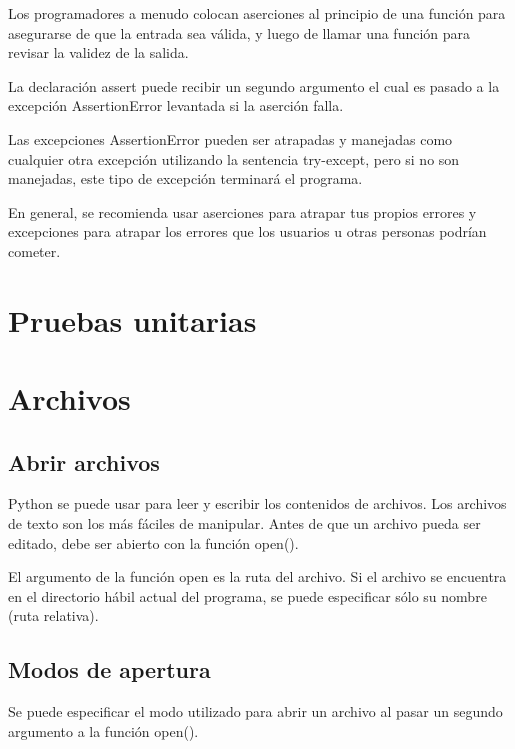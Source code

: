 \documentclass{report}
\begin{document}

Los programadores a menudo colocan aserciones al principio de una función para asegurarse de que la entrada sea válida, y luego de llamar una función para revisar la validez de la salida.

La declaración assert puede recibir un segundo argumento el cual es pasado a la excepción AssertionError levantada si la aserción falla.


Las excepciones AssertionError pueden ser atrapadas y manejadas como cualquier otra excepción utilizando la sentencia try-except, pero si no son manejadas, este tipo de excepción terminará el programa.

En general, se recomienda usar aserciones para atrapar tus propios errores y excepciones para atrapar los errores que los usuarios u otras personas podrían cometer.


\clearpage\chapter{Pruebas unitarias}

\clearpage\chapter{Archivos}

\section{Abrir archivos}

Python se puede usar para leer y escribir los contenidos de archivos. Los archivos de texto son los más fáciles de manipular.
Antes de que un archivo pueda ser editado, debe ser abierto con la función open().


El argumento de la función open es la ruta del archivo. Si el archivo se encuentra en el directorio hábil actual del programa, se puede especificar sólo su nombre (ruta relativa).

\section{Modos de apertura}

Se puede especificar el modo utilizado para abrir un archivo al pasar un segundo argumento a la función open().
\end{document}
